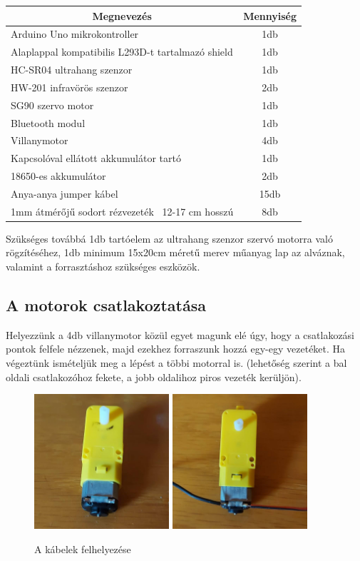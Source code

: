 \documentclass[]{thesis-ekf}
\theoremstyle{definition}
\begin{document}
\begin{center}
	\begin{tabular}{|l|c|}
	\hline
	\multicolumn{1}{|c|}{\textbf{Megnevezés}}&\textbf{Mennyiség}\\
	\hline
	Arduino Uno mikrokontroller&1db\\
	\hline
	Alaplappal kompatibilis L293D-t tartalmazó shield&1db\\
	\hline
	HC-SR04 ultrahang szenzor&1db\\
	\hline
	HW-201 infravörös szenzor&2db\\
	\hline
	SG90 szervo motor&1db\\
	\hline
	Bluetooth modul&1db\\
	\hline
	Villanymotor&4db\\
	\hline
	Kapcsolóval ellátott akkumulátor tartó&1db\\
	\hline
	18650-es akkumulátor&2db\\
	\hline
	Anya-anya jumper kábel&15db\\
	\hline
	1mm átmérőjű sodort rézvezeték ~12-17 cm hosszú&8db\\
	\hline
\end{tabular}
\end{center}
Szükséges továbbá 1db tartóelem az ultrahang szenzor szervó motorra való rögzítéséhez, 1db minimum 15x20cm méretű merev műanyag lap az alváznak, valamint a forrasztáshoz szükséges eszközök.
\subsection{A motorok csatlakoztatása}
Helyezzünk a 4db villanymotor közül egyet magunk elé úgy, hogy a csatlakozási pontok felfele nézzenek, majd ezekhez forraszunk hozzá egy-egy vezetéket. Ha végeztünk ismételjük meg a lépést a többi motorral is. (lehetőség szerint a bal oldali csatlakozóhoz fekete, a jobb oldalihoz piros vezeték kerüljön).
\begin{figure}[h]
	\centering
	\includegraphics[width=5cm]{images/robot_build/motor-no-cable}
	\includegraphics[width=5cm]{images/robot_build/motor-with-cable}
	\caption{A kábelek felhelyezése}
	\label{motor-handling}
\end{figure}
\end{document}
